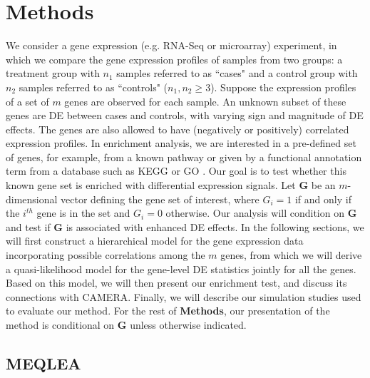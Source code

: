 \documentclass[a4,center,fleqn]{NAR}
\newcommand{\OurMethod}{MEQLEA}
\begin{document}
	\section{Methods}\label{section:methods}
	We consider a gene expression (e.g. RNA-Seq or microarray) experiment, in which we compare the gene
	expression profiles of samples from two groups: a treatment group with $n_1$ samples referred to as
	``cases" and a control group with $n_2$ samples referred to as ``controls" ($n_1,n_2\ge 3$). Suppose
	the expression profiles of a set of $m$ genes are observed for each sample. An unknown subset of
	these genes are DE between cases and controls, with varying sign and magnitude of DE effects. The
	genes are also allowed to have (negatively or positively) correlated expression profiles. In
	enrichment analysis, we are interested in a pre-defined set of genes, for example, from a known
	pathway or given by a functional annotation term from a database such as KEGG
	\citep{kanehisa2000kegg} or GO \citep{ashburner2000gene}. Our goal is to test whether this known
	gene set is enriched with differential expression signals. Let $\bm G$ be an $m$-dimensional vector
	defining the gene set of interest, where $G_i=1$ if and only if the $i^{th}$ gene is in the set and
	$G_i=0$ otherwise. Our analysis will condition on $\bm G$ and test if $\bm G$ is associated with
	enhanced DE effects. In the following sections, we will first construct a hierarchical model for the
	gene expression data incorporating possible correlations among the $m$ genes, from which we will
	derive a quasi-likelihood model for the gene-level DE statistics jointly for all the genes. Based on
	this model, we will then present our enrichment test, and discuss its connections with CAMERA.
	Finally, we will describe our simulation studies used to evaluate our method. For the rest of
	\textbf{Methods}, our presentation of the method is conditional on $\bm G$ unless otherwise
	indicated.
	
	\subsection{\OurMethod}
\end{document}
